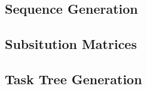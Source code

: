 \subsection{Sequence Generation}

\subsection{Subsitution Matrices}


\subsection{Task Tree Generation}
